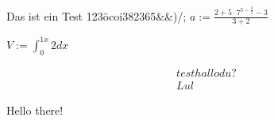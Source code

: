 % 
%
\usepackage{amsmath}
\usepackage{test}


Das ist ein Test 123öcoi382365&&)/;
$a:=\frac{2+5 \cdot{} 7^{5-\frac{3}{2}}-3}{3+2}$

$V := \int_{0}^{1 x}2dx$

\begin{align}
    test hallo du?\\
    Lul
\end{align}

Hello there!




